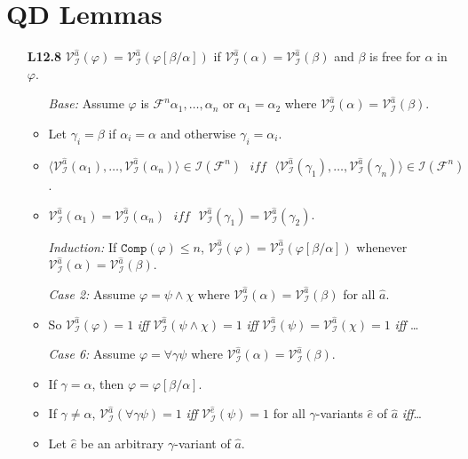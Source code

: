\documentclass[a4paper, 11pt]{article} %
\newcommand{\tuple}[1]{\langle#1\rangle} %
\newcommand{\I}{\mathcal{I}}
\newcommand{\F}{\mathcal{F}}
\newcommand{\comp}{\texttt{Comp}}
\newcommand{\VV}[2]{\mathcal{V}_{#1}^{#2}} %
\newcommand{\va}[1]{\hat{#1}} %
\newcommand{\qt}[2]{#1 #2} %
\newcommand{\unisub}[2]{[#1/#2]}
\def\metaA{\ensuremath{\varphi}}
\def\metaB{\ensuremath{\psi}}
\def\metaC{\ensuremath{\chi}}
\begin{document}
\vspace{-.2in}



\section*{QD Lemmas}

\begin{enumerate}[labelsep=.1in]
  \item[\bf L12.8] $\VV{\I}{\va{a}}(\metaA)=\VV{\I}{\va{a}}(\metaA\unisub{\beta}{\alpha})$ if $\VV{\I}{\va{a}}(\alpha)=\VV{\I}{\va{a}}(\beta)$ and $\beta$ is free for $\alpha$ in $\metaA$.
    \begin{itemize}
      \item[\it Base:] Assume $\metaA$ is $\F^n\alpha_1,\ldots,\alpha_n$ or $\alpha_1=\alpha_2$ where $\VV{\I}{\va{a}}(\alpha)=\VV{\I}{\va{a}}(\beta)$. 
      \item Let $\gamma_i=\beta$ if $\alpha_i=\alpha$ and otherwise $\gamma_i=\alpha_i$.
      \item $\tuple{\VV{\I}{\va{a}}(\alpha_1),\ldots,\VV{\I}{\va{a}}(\alpha_n)}\in\I(\F^n) \textit{ ~iff~ } \tuple{\VV{\I}{\va{a}}(\gamma_1),\ldots,\VV{\I}{\va{a}}(\gamma_n)}\in\I(\F^n)$.
      \item $\VV{\I}{\va{a}}(\alpha_1)=\VV{\I}{\va{a}}(\alpha_n) \textit{ ~iff~ } \VV{\I}{\va{a}}(\gamma_1)=\VV{\I}{\va{a}}(\gamma_2)$.
      \item[\it Induction:] If $\comp(\metaA)\leq n$, $\VV{\I}{\va{a}}(\metaA)=\VV{\I}{\va{a}}(\metaA\unisub{\beta}{\alpha})$ whenever $\VV{\I}{\va{a}}(\alpha)=\VV{\I}{\va{a}}(\beta)$.
      \item[\it Case 2:] Assume $\metaA=\metaB\wedge\metaC$ where $\VV{\I}{\va{a}}(\alpha)=\VV{\I}{\va{a}}(\beta)$ for all $\va{a}$.
      \item So $\VV{\I}{\va{a}}(\metaA)=1$ \textit{iff} $\VV{\I}{\va{a}}(\metaB\wedge\metaC)=1$ \textit{iff} $\VV{\I}{\va{a}}(\metaB)=\VV{\I}{\va{a}}(\metaC)=1$ \textit{iff} \ldots
      \item[\it Case 6:] Assume $\metaA=\qt{\forall}{\gamma}\metaB$ where $\VV{\I}{\va{a}}(\alpha)=\VV{\I}{\va{a}}(\beta)$.
      \item If $\gamma=\alpha$, then $\metaA=\metaA\unisub{\beta}{\alpha}$.
      \item If $\gamma\neq\alpha$, $\VV{\I}{\va{a}}(\qt{\forall}{\gamma}\metaB)=1$ \textit{iff} $\VV{\I}{\va{e}}(\metaB)=1$ for all $\gamma$-variants $\va{e}$ of $\va{a}$ \textit{iff}\ldots
      \item Let $\va{e}$ be an arbitrary $\gamma$-variant of $\va{a}$.

\end{itemize}
\end{enumerate}
\end{document}
